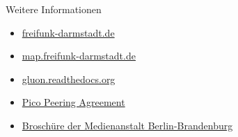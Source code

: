 \documentclass{beamer}
\begin{document}
\begin{frame}{Weitere Informationen}
\begin{itemize}
	\item \href{http://freifunk-darmstadt.de}{freifunk-darmstadt.de}
	\item \href{http://map.freifunk-darmstadt.de}{map.freifunk-darmstadt.de}
	\item \href{http://gluon.readthedocs.org}{gluon.readthedocs.org}
	\item \href{http://paderborn.freifunk.net/?page_id=42}{Pico Peering Agreement}
	\item \href{http://mabb.de/files/content/document/Publikationen/Freifunk-Broschuere/freifunk_publikation_webversion.pdf}{Broschüre der Medienanstalt Berlin-Brandenburg}
\end{itemize}
\end{frame}
\end{document}
